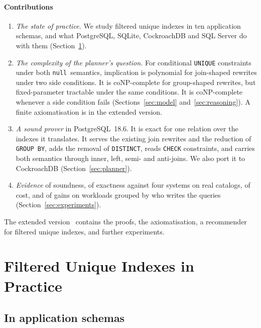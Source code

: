 \documentclass[conference]{IEEEtran}
\theoremstyle{definition}
\newcommand{\sql}[1]{\texttt{#1}}
\newcommand{\nul}{\texttt{null}}
\newif\ifextended
\begin{document}
\paragraph*{Contributions}
\begin{enumerate}
\item \emph{The state of practice.} We study filtered unique indexes in ten application schemas, and what
  PostgreSQL, SQLite, CockroachDB and SQL Server do with them (Section~\ref{sec:practice}).
\item \emph{The complexity of the planner's question.} For conditional \sql{UNIQUE} constraints under both \nul\
  semantics, implication is polynomial for join-shaped rewrites under two side conditions. It is coNP-complete for
  group-shaped rewrites, but fixed-parameter tractable under the same conditions. It is coNP-complete whenever a side
  condition fails (Sections~\ref{sec:model} and~\ref{sec:reasoning}). A finite axiomatisation is in \ifextended the
  appendix\else the extended version\fi.
\item \emph{A sound prover} in PostgreSQL~18.6. It is exact for one relation over the indexes it translates. It serves
  the existing join rewrites and the reduction of \sql{GROUP BY}, adds the removal of \sql{DISTINCT}, reads \sql{CHECK}
  constraints, and carries both semantics through inner, left, semi- and anti-joins. We also port it to CockroachDB
  (Section~\ref{sec:planner}).
\item \emph{Evidence} of soundness, of exactness against four systems on real catalogs, of cost, and of gains on
  workloads grouped by who writes the queries (Section~\ref{sec:experiments}).
\end{enumerate}
\ifextended The appendix \else The extended version~\cite{EXT} \fi contains the proofs, the axiomatisation, a
recommender for filtered unique indexes, and further experiments.


\section{Filtered Unique Indexes in Practice}\label{sec:practice}

\subsection{In application schemas}\label{sec:schemas}
\end{document}
